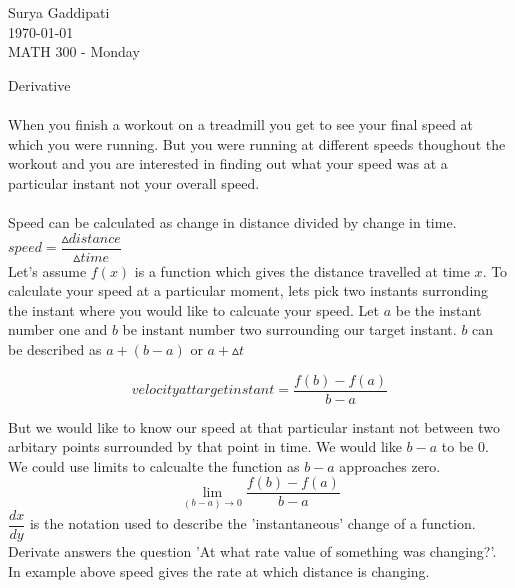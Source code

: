 \documentclass[12pt]{article}
\begin{document}
 

Surya Gaddipati\\
\today\\
MATH 300 - Monday

\begin{center}
Derivative
\end{center}
\paragraph{}
 When you finish a workout on a treadmill you get to see your final speed at which you were running. But you were running at different speeds thoughout the workout and you are interested in finding out what your speed was at a particular instant not your overall speed.    
 \paragraph{}
 Speed can be calculated as change in distance divided by change in time. \\
  $ speed = \dfrac{\vartriangle distance}{\vartriangle time}$ \\
  Let's assume $f(x)$ is a function which gives the distance travelled at time $x$.
  To calculate your speed at a particular moment, lets pick two instants surronding the instant where you would like to calcuate your speed.  
  Let $a$ be the instant number one and $b$ be instant number two surrounding our target instant. $b$ can be described as $a + (b -a)$  or $a + \vartriangle t$

  \begin{equation} 
    velocity at target instant = \dfrac { f(b) - f(a) } { b -a }
  \end{equation}
  
  But we would like to know our speed at that particular instant not between two arbitary points surrounded by that point in time. We would like $b-a$ to be $0$. We could use limits to calcualte the function as $b-a$ approaches zero. 
  \begin{equation}
    \lim_{(b -a) \to 0} \dfrac { f(b) - f(a) } { b -a } 
  \end{equation}
 $ \dfrac{dx}{dy} $ is the notation used to describe the 'instantaneous' change of a function. 
 Derivate answers the question 'At what rate value of something was changing?'. In example above speed gives the rate at which distance is changing.


  
\end{document}
